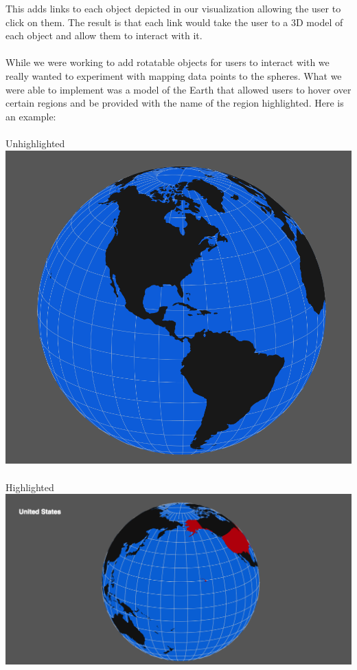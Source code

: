 \documentclass[journal]{vgtc}                %
\begin{document}
This adds links to each object depicted in our visualization allowing the user to click on them.
The result is that each link would take the user to a 3D model of each object and allow them to interact with it.
\\\\
While we were working to add rotatable objects for users to interact with we really wanted to experiment with mapping data points to the spheres. 
What we were able to implement was a model of the Earth that allowed users to hover over certain regions and be provided with the name of the region highlighted.
Here is an example:
\\\\
Unhighlighted\\
\includegraphics[width=\linewidth]{earth}
\\\\
Highlighted\\
\includegraphics[width=\linewidth]{earth-selected}
\end{document}
